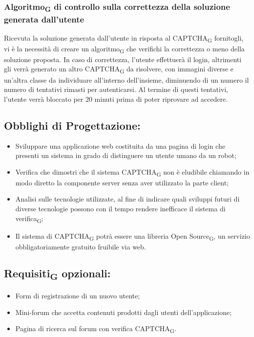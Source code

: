 \subsubsection{Algoritmo\textsubscript{G} di controllo sulla correttezza della soluzione generata dall'utente}
Ricevuta la soluzione generata dall'utente in risposta al CAPTCHA\textsubscript{G} fornitogli, vi è la necessità di creare un algoritmo\textsubscript{G} che verifichi la correttezza o meno della soluzione proposta. In caso di correttezza, l'utente effettuerà il login, altrimenti gli verrà generato un altro CAPTCHA\textsubscript{G} da risolvere, con immagini diverse e un'altra classe da individuare all'interno dell'insieme, diminuendo di un numero il numero di tentativi rimasti per autenticarsi. Al termine di questi tentativi, l'utente verrà bloccato per 20 minuti prima di poter riprovare ad accedere. 

\subsection{Obblighi di Progettazione:}\:
\begin{itemize}
    \item Sviluppare una applicazione web costituita da una pagina di login che presenti un sistema in grado di distinguere un utente umano da un robot;
    \item Verifica che dimostri che il sistema CAPTCHA\textsubscript{G} non è eludibile chiamando in modo diretto la componente server senza aver utilizzato la parte client;
    \item Analisi sulle tecnologie utilizzate, al fine di indicare quali sviluppi futuri di diverse tecnologie possono con il tempo rendere inefficace il sistema di verifica\textsubscript{G};
    \item Il sistema di CAPTCHA\textsubscript{G} potrà essere una libreria Open Source\textsubscript{G}, un servizio obbligatoriamente gratuito fruibile via web.
\end{itemize}

\subsection{Requisiti\textsubscript{G} opzionali:}\:
\begin{itemize}
    \item Form di registrazione di un nuovo utente;
    \item Mini-forum che accetta contenuti prodotti dagli utenti dell'applicazione;
    \item Pagina di ricerca sul forum con verifica CAPTCHA\textsubscript{G}.
\end{itemize}


